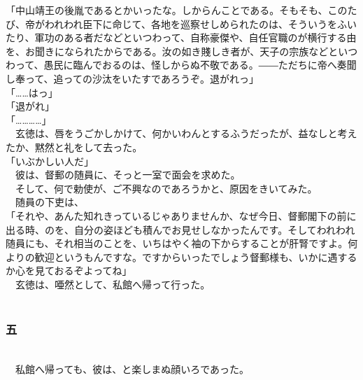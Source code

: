 \documentclass[
  paper=a5,
  fontsize=10pt,
  jafontsize=9.5pt,
  tate,                  %
  open_bracket_pos=nibu, %
]{jlreq}
\begin{document}
「中山靖王の後胤であるとかいったな。しからんことである。そもそも、このたび、帝がわれわれ臣下に命じて、各地を巡察せしめられたのは、そういうをふいたり、軍功のある者だなどといつわって、自称豪傑や、自任官職のが横行する由を、お聞きになられたからである。汝の如き賤しき者が、天子の宗族などといつわって、愚民に臨んでおるのは、怪しからぬ不敬である。――ただちに帝へ奏聞し奉って、追っての沙汰をいたすであろうぞ。退がれっ」\\


「……はっ」\\


「退がれ」\\


「…………」\\


　玄徳は、唇をうごかしかけて、何かいわんとするふうだったが、益なしと考えたか、黙然と礼をして去った。\\


「いぶかしい人だ」\\


　彼は、督郵の随員に、そっと一室で面会を求めた。\\


　そして、何で勅使が、ご不興なのであろうかと、原因をきいてみた。\\


　随員の下吏は、\\


「それや、あんた知れきっているじゃありませんか、なぜ今日、督郵閣下の前に出る時、のを、自分の姿ほども積んでお見せしなかったんです。そしてわれわれ随員にも、それ相当のことを、いちはやく袖の下からすることが肝腎ですよ。何よりの歓迎というもんですな。ですからいったでしょう督郵様も、いかに遇するか心を見ておるぞよってね」\\


　玄徳は、唖然として、私館へ帰って行った。\\

\\

\subsubsection{五}

\\


　私館へ帰っても、彼は、と楽しまぬ顔いろであった。\\
\end{document}
